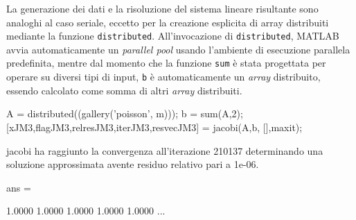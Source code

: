 La generazione dei dati e la risoluzione del sistema lineare risultante sono analoghi al caso seriale, eccetto per la creazione esplicita di array
distribuiti mediante la funzione \lstinline{distributed}.\newline
All'invocazione di \lstinline{distributed}, MATLAB avvia automaticamente un \textit{parallel pool} usando l'ambiente di esecuzione parallela predefinita, mentre dal momento che la funzione \lstinline{sum} \`e stata progettata per operare su diversi tipi di input, \lstinline{b} \`e automaticamente un \textit{array} distribuito, essendo
calcolato come somma di altri \textit{array} distribuiti.
\begin{matlabcode}
    A = distributed((gallery('poisson', m)));
    b = sum(A,2);
    [xJM3,flagJM3,relresJM3,iterJM3,resvecJM3] = jacobi(A,b,
                                                 [],maxit);
\end{matlabcode}
\begin{matlaboutput}
    jacobi ha raggiunto la convergenza all'iterazione 210137
    determinando una soluzione approssimata avente residuo
    relativo pari a 1e-06.

    ans =

    1.0000    1.0000    1.0000    1.0000    1.0000    ...
\end{matlaboutput}
